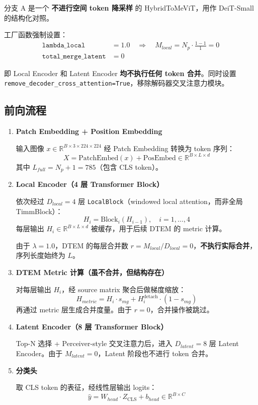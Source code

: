 \documentclass[a4paper,11pt]{article}
\begin{document}
分支 A 是一个 \textbf{不进行空间 token 降采样} 的 HybridToMeViT，用作 DeiT-Small 的结构化对照。

工厂函数强制设置：
\begin{align*}
    \texttt{lambda\_local} &= 1.0 \quad \Rightarrow \quad M_{local} = N_p \cdot \frac{1-1}{1} = 0 \\
    \texttt{total\_merge\_latent} &= 0
\end{align*}

即 Local Encoder 和 Latent Encoder \textbf{均不执行任何 token 合并}。同时设置 \texttt{remove\_decoder\_cross\_attention=True}，移除解码器交叉注意力模块。

\subsection{前向流程}

\begin{enumerate}
    \item \textbf{Patch Embedding + Position Embedding}
    
    输入图像 $x \in \mathbb{R}^{B \times 3 \times 224 \times 224}$ 经 Patch Embedding 转换为 token 序列：
    \[
        X = \text{PatchEmbed}(x) + \text{PosEmbed} \in \mathbb{R}^{B \times L \times d}
    \]
    其中 $L_{full} = N_p + 1 = 785$（包含 CLS token）。
    
    \item \textbf{Local Encoder（4 层 Transformer Block）}
    
    依次经过 $D_{local}=4$ 层 \texttt{LocalBlock}（windowed local attention，而非全局 TimmBlock）：
    \[
        H_i = \text{Block}_i(H_{i-1}), \quad i = 1, \dots, 4
    \]
    每层输出 $H_i \in \mathbb{R}^{B \times L \times d}$ 被缓存，用于后续 DTEM 的 metric 计算。
    
    由于 $\lambda=1.0$，DTEM 的每层合并数 $r = M_{local} / D_{local} = 0$，\textbf{不执行实际合并}，序列长度始终为 $L$。

    \item \textbf{DTEM Metric 计算（虽不合并，但结构存在）}
    
    对每层输出 $H_i$，经 source matrix 聚合后做梯度缩放：
    \[
        H_{metric} = H_i \cdot s_{mg} + H_i^{\text{detach}} \cdot (1 - s_{mg})
    \]
    再通过 metric 层生成合并度量。由于 $r=0$，合并操作被跳过。

    \item \textbf{Latent Encoder（8 层 Transformer Block）}
    
    Top-N 选择 + Perceiver-style 交叉注意力后，进入 $D_{latent}=8$ 层 Latent Encoder。由于 $M_{latent}=0$，Latent 阶段也不进行 token 合并。

    \item \textbf{分类头}
    
    取 CLS token 的表征，经线性层输出 logits：
    \[
        \hat{y} = W_{head} \cdot Z_{\text{CLS}} + b_{head} \in \mathbb{R}^{B \times C}
    \]
\end{enumerate}
\end{document}
